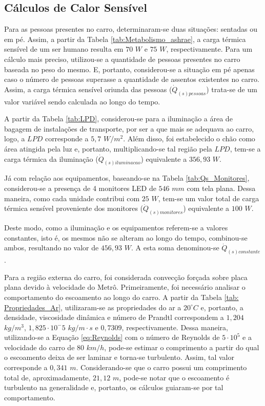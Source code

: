 \documentclass[acronym,symbols,table]{fei}
\begin{document}
\subsection{Cálculos de Calor Sensível}

Para as pessoas presentes no carro, determinaram-se duas situações: sentadas ou em pé. Assim, a partir da Tabela \ref{tab:Metabolismo_ashrae}, a carga térmica sensível de um ser humano resulta em $70$ $W$ e $75$ $W$, respectivamente. Para um cálculo mais preciso, utilizou-se a quantidade de pessoas presentes no carro baseada no peso do mesmo. E, portanto, considerou-se a situação em pé apenas caso o número de pessoas superasse a quantidade de assentos existentes no carro. Assim, a carga térmica sensível oriunda das pessoas ($\dot{Q}_{(s)pessoas}$) trata-se de um valor variável sendo calculada ao longo do tempo. 

A partir da Tabela \ref{tab:LPD}, considerou-se para a iluminação a área de bagagem de instalações de transporte, por ser a que mais se adequava ao carro, logo, a $LPD$ corresponde a $5,7$ $W/m^2$. Além disso, foi estabelecido o chão como área atingida pela luz e, portanto, multiplicando-se tal região pela $LPD$, tem-se a carga térmica da iluminação ($\dot{Q}_{(s)iluminacao}$) equivalente a $356,93$ $W$.

Já com relação aos equipamentos, baseando-se na Tabela \ref{tab:Qs_Monitores}, considerou-se a presença de 4 monitores LED de $546$ $mm$ com tela plana. Dessa maneira, como cada unidade contribui com $25$ $W$, tem-se um valor total de carga térmica sensível proveniente dos monitores ($\dot{Q}_{(s)monitores}$) equivalente a $100$ $W$.

Deste modo, como a iluminação e os equipamentos referem-se a valores constantes, isto é, os mesmos não se alteram ao longo do tempo, combinou-se ambos, resultando no valor de $456,93$ $W$. A esta soma denominou-se $\dot{Q}_{(s)constante}$.

Para a região externa do carro, foi considerada convecção forçada sobre placa plana devido à velocidade do Metrô. Primeiramente, foi necessário analisar o comportamento do escoamento ao longo do carro. A partir da Tabela \ref{tab: Propriedades_Ar}, utilizaram-se as propriedades do ar a $20^\circ C$ e, portanto, a densidade, viscosidade dinâmica e número de Prandtl correspondem a $1,204$ $kg/m^3$, $1,825 \cdot 10^-5$ $kg/m \cdot s$ e $0,7309$, respectivamente. Dessa maneira, utilizando-se a Equação \ref{eq:Reynolds} com o número de Reynolds de $5 \cdot 10^5$ e a velocidade do carro de $80$ $km/h$, pode-se estimar o comprimento a partir do qual o escoamento deixa de ser laminar e torna-se turbulento. Assim, tal valor corresponde a $0,341$ $m$. Considerando-se que o carro possui um comprimento total de, aproximadamente, $21,12$ $m$, pode-se notar que o escoamento é turbulento na generalidade e, portanto, os cálculos guiaram-se por tal comportamento.
\end{document}
